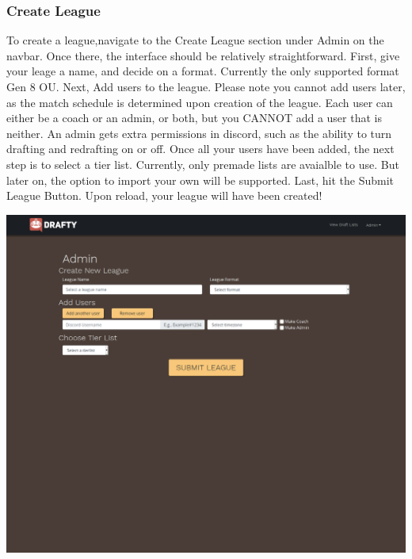 \documentclass{article}
\begin{document}
  \subsubsection*{Create League}
  To create a league,navigate to the Create League section under Admin on the navbar. Once there, the interface should be relatively straightforward. 
  First, give your leage a name, and decide on a format. Currently the only supported format Gen 8 OU. Next, Add users to the league. 
  Please note you cannot add users later, as the match schedule is determined upon creation of the league. 
  Each user can either be a coach or an admin, or both, but you CANNOT add a user that is neither. 
  An admin gets extra permissions in discord, such as the ability to turn drafting and redrafting on or off.
  Once all your users have been added, the next step is to select a tier list. 
  Currently, only premade lists are avaialble to use. But later on, the option to import your own will be supported.
  Last, hit the Submit League Button. Upon reload, your league will have been created!\\
  \begin{center}
    \includegraphics[scale=.3]{create_league.png}
  \end{center}
\end{document}
